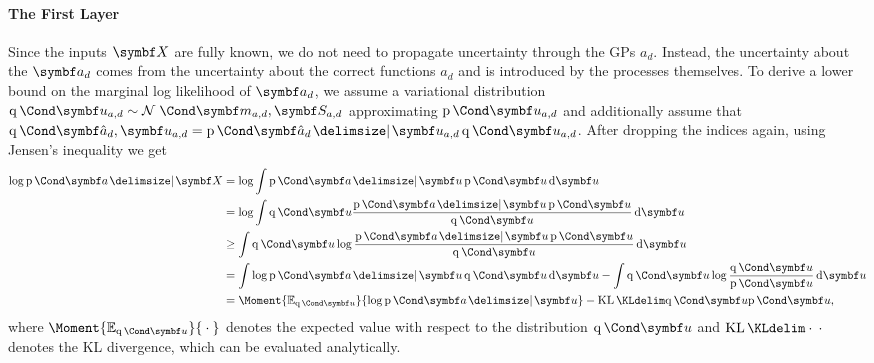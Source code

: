 \paragraph{The First Layer}
\label{sub:timeseries_alignment:first_layer}
Since the inputs $\mat{X}$ are fully known, we do not need to propagate uncertainty through the GPs $a_d$.
Instead, the uncertainty about the $\rv{a_d}$ comes from the uncertainty about the correct functions $a_d$ and is introduced by the processes themselves.
To derive a lower bound on the marginal log likelihood of $\rv{a_d}$, we assume a variational distribution $\Variat{\rv{u_{a, d}}} \sim \Gaussian{\mat{m_{a, d}}, \mat{S_{a, d}}}$ approximating $\Prob{\rv{u_{a, d}}}$ and additionally assume that $\Variat{\rv{\hat{a}_d}, \rv{u_{a, d}}} = \Prob{\rv{\hat{a}_d} \given \rv{u_{a, d}}}\Variat{\rv{u_{a, d}}}$.
After dropping the indices again, using Jensen's inequality we get
\begin{align}
    \label{eq:timeseries_alignment:svgp_log_likelihood}
    \begin{split}
        \log \Prob{\rv{a} \given \mat{X}} &= \log \int \Prob{\rv{a} \given \rv{u}} \Prob{\rv{u}} \diff \rv{u} \\
        &= \log \int \Variat{\rv{u}} \frac{\Prob{\rv{a} \given \rv{u}} \Prob{\rv{u}}}{\Variat{\rv{u}}} \diff \rv{u} \\
        &\geq \int \Variat{\rv{u}} \log \frac{\Prob{\rv{a} \given \rv{u}} \Prob{\rv{u}}}{\Variat{\rv{u}}} \diff \rv{u} \\
        &= \int \log \Prob{\rv{a} \given \rv{u}} \Variat{\rv{u}} \diff \rv{u} - \int \Variat{\rv{u}} \log \frac{\Variat{\rv{u}}}{\Prob{\rv{u}}} \diff \rv{u} \\
        &= \Moment{\E_{\Variat{\rv{u}}}}{\log \Prob{\rv{a} \given \rv{u}}} - \KL{\Variat{\rv{u}}}{\Prob{\rv{u}}},
    \end{split}
\end{align}
where $\Moment{\E_{\Variat{\rv{u}}}}{{}\cdot{}}$ denotes the expected value with respect to the distribution $\Variat{\rv{u}}$ and $\KL{{}\cdot{}}{{}\cdot{}}$ denotes the KL divergence, which can be evaluated analytically.

